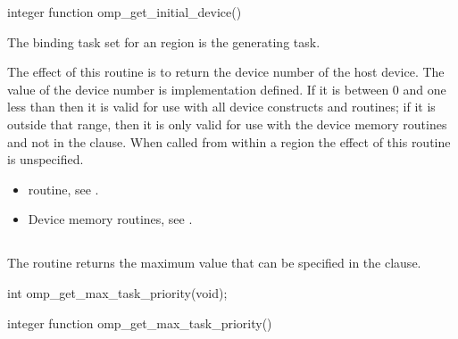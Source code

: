 \begin{fortranspecific}
\begin{ompfFunction}
integer function omp_get_initial_device()
\end{ompfFunction}
\end{fortranspecific}

\binding
The binding task set for an  region 
is the generating task.

\effect
The effect of this routine is to return the device number of the 
host device. The value of the device number is implementation defined.
If it is between 0 and one less than  then 
it is valid for use with all device constructs and routines; if it is 
outside that range, then it is only valid for use with the device 
memory routines and not in the  clause. When called from 
within a  region the effect of this routine is unspecified.

\crossreferences
\begin{itemize}

\item {} routine, see
.

\item Device memory routines, see .
\end{itemize}



\subsection{}
\label{subsec:omp_get_max_task_priority}
\summary

The  routine returns the maximum value 
that can be specified in the  clause.

\begin{samepage}
\format
\begin{ccppspecific}
\begin{ompcFunction}
int omp_get_max_task_priority(void);
\end{ompcFunction}
\end{ccppspecific}
\end{samepage}

\begin{fortranspecific}
\begin{ompfFunction}
integer function omp_get_max_task_priority()
\end{ompfFunction}
\end{fortranspecific}

